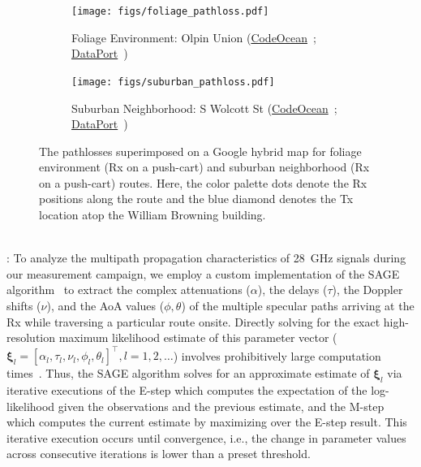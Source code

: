 \documentclass[10pt, twocolumn]{IEEEtran}
\begin{document}
{\begin{figure} [t]
    \centering
    \begin{subfigure}{0.5565\linewidth}
        \centering
        \texttt{[image: figs/foliage\_pathloss.pdf]}
        \caption{Foliage Environment: Olpin Union (\href{https://codeocean.com/capsule/9545863/tree}{CodeOcean}~\cite{CodeOcean}; \href{http://ieee-dataport.org/12580}{DataPort}~\cite{DataPort})}
        \label{F6a}
    \end{subfigure}
    \begin{subfigure}{0.4335\linewidth}
        \centering
        \texttt{[image: figs/suburban\_pathloss.pdf]}
        \caption{Suburban Neighborhood: S Wolcott St (\href{https://codeocean.com/capsule/9545863/tree}{CodeOcean}~\cite{CodeOcean}; \href{http://ieee-dataport.org/12580}{DataPort}~\cite{DataPort})}
        \label{F6b}
    \end{subfigure}
    \vspace{-5mm}
    \caption{The pathlosses superimposed on a Google hybrid map for foliage environment (Rx on a push-cart) and suburban neighborhood (Rx on a push-cart) routes. Here, the color palette dots denote the Rx positions along the route and the blue diamond denotes the Tx location atop the William Browning building.}
    \vspace{-3mm}
    \label{F6}
\end{figure}
\\: To analyze the multipath propagation characteristics of \SI{28}{\giga\hertz} signals during our measurement campaign, we employ a custom implementation of the SAGE algorithm~\cite{SAGE} to extract the complex attenuations ($\alpha$), the delays ($\tau$), the Doppler shifts ($\nu$), and the AoA values ($\phi,\theta$) of the multiple specular paths arriving at the Rx while traversing a particular route onsite. Directly solving for the exact high-resolution maximum likelihood estimate of this parameter vector ($\boldsymbol{\xi}_{l}{=}[\alpha_{l},\tau_{l},\nu_{l},\phi_{l},\theta_{l}]^{\intercal},l{=}1,2,{\dots}$) involves prohibitively large computation times~\cite{SAGE}. Thus, the SAGE algorithm solves for an approximate estimate of $\boldsymbol{\xi}_{l}$ via iterative executions of the E-step which computes the expectation of the log-likelihood given the observations and the previous estimate, and the M-step which computes the current estimate by maximizing over the E-step result. This iterative execution occurs until convergence, i.e., the change in parameter values across consecutive iterations is lower than a preset threshold.
}
\end{document}

